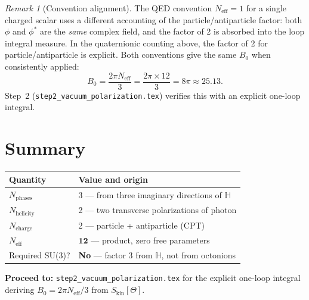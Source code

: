 \documentclass[12pt,a4paper]{article}
\theoremstyle{definition}
\theoremstyle{remark}
\newtheorem{remark}[theorem]{Remark}
\renewcommand{\H}{\mathbb{H}}
\newcommand{\Neff}{N_{\mathrm{eff}}}
\begin{document}
\begin{remark}[Convention alignment]
The QED convention $\Neff = 1$ for a single charged scalar uses a different
accounting of the particle/antiparticle factor: both $\phi$ and $\phi^*$
are the \emph{same} complex field, and the factor of 2 is absorbed into the
loop integral measure.  In the quaternionic counting above, the factor of 2
for particle/antiparticle is explicit.  Both conventions give the same $B_0$
when consistently applied:
\begin{equation}
  B_0 = \frac{2\pi \Neff}{3} = \frac{2\pi \times 12}{3} = 8\pi \approx 25.13.
  \label{eq:B0}
\end{equation}
Step~2 (\texttt{step2\_vacuum\_polarization.tex}) verifies this with an
explicit one-loop integral.
\end{remark}

\section{Summary}
\label{sec:summary}
\begin{center}
\begin{tabular}{lp{8.5cm}}
  \toprule
  \textbf{Quantity} & \textbf{Value and origin} \\
  \midrule
  $N_\mathrm{phases}$ & 3 — from three imaginary directions of $\H$ \\
  $N_\mathrm{helicity}$ & 2 — two transverse polarizations of photon \\
  $N_\mathrm{charge}$ & 2 — particle + antiparticle (CPT) \\
  $\Neff$ & $\mathbf{12}$ — product, zero free parameters \\
  \midrule
  Required SU(3)? & \textbf{No} — factor 3 from $\H$, not from octonions \\
  \bottomrule
\end{tabular}
\end{center}

\noindent\textbf{Proceed to:}
\texttt{step2\_vacuum\_polarization.tex} for the explicit one-loop integral
deriving $B_0 = 2\pi\Neff/3$ from $S_\mathrm{kin}[\Theta]$.
\end{document}
